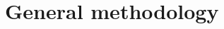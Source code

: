 \documentclass[11pt,oneside,leqno,openright]{report}
\begin{document}
% 

% 









\chapter{General methodology}




% 
\end{document}
